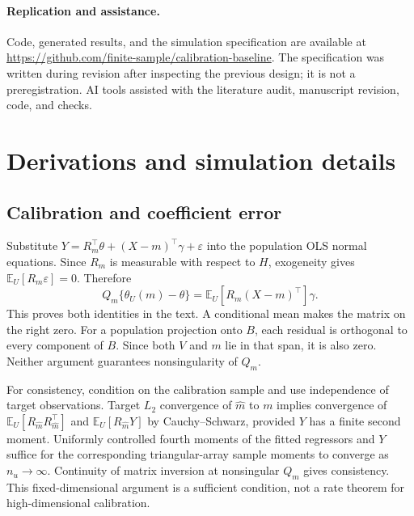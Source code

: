\documentclass[11pt]{article}
\newcommand{\E}{\mathbb{E}}
\begin{document}
\paragraph{Replication and assistance.}
Code, generated results, and the simulation specification are available at
\url{https://github.com/finite-sample/calibration-baseline}.
The specification was written during revision after inspecting the previous design; it is not a preregistration. AI tools assisted with the literature audit, manuscript revision, code, and checks.

\begingroup
\small\singlespacing
\setlength{\bibsep}{3pt}


\endgroup

\clearpage
\appendix
\renewcommand{\thetable}{A\arabic{table}}
\renewcommand{\thefigure}{A\arabic{figure}}
\renewcommand{\theequation}{A\arabic{equation}}
\setcounter{table}{0}\setcounter{figure}{0}\setcounter{equation}{0}
\section{Derivations and simulation details}

\subsection{Calibration and coefficient error}
Substitute $Y=R_m^\top\theta+(X-m)^\top\gamma+\varepsilon$ into the population OLS normal equations. Since $R_m$ is measurable with respect to $H$, exogeneity gives $\E_U[R_m\varepsilon]=0$. Therefore
\begin{equation}
Q_m\{\theta_U(m)-\theta\}=\E_U[R_m(X-m)^\top]\gamma.
\end{equation}
This proves both identities in the text. A conditional mean makes the matrix on the right zero. For a population projection onto $B$, each residual is orthogonal to every component of $B$. Since both $V$ and $m$ lie in that span, it is also zero. Neither argument guarantees nonsingularity of $Q_m$.

For consistency, condition on the calibration sample and use independence of target observations. Target $L_2$ convergence of $\widehat m$ to $m$ implies convergence of $\E_U[R_{\widehat m}R_{\widehat m}^\top]$ and $\E_U[R_{\widehat m}Y]$ by Cauchy--Schwarz, provided $Y$ has a finite second moment. Uniformly controlled fourth moments of the fitted regressors and $Y$ suffice for the corresponding triangular-array sample moments to converge as $n_u\to\infty$. Continuity of matrix inversion at nonsingular $Q_m$ gives consistency. This fixed-dimensional argument is a sufficient condition, not a rate theorem for high-dimensional calibration.
\end{document}
